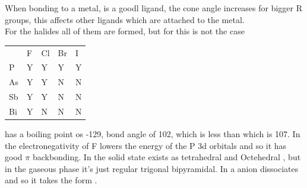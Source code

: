 \documentclass{article}
\begin{document}
    When bonding to a metal,  is a goodl ligand, the cone angle increases for bigger R groups, this affects
    other ligands which are attached to the metal. \\

    For the  halides all of them are formed, but for  this is not the case

    \begin{tabular}{l l l l l}
         & F & Cl & Br & I\\
      P  & Y  & Y & Y & Y \\
      As & Y & Y & N & N\\
      Sb & Y & Y & N & N\\
      Bi & Y & N & N & N
    \end{tabular}

     has a boiling point os -129, bond angle of 102, which is less than  which is 107.
    In  the electronegativity of F lowers the energy of the P 3d orbitals and so it has good $\pi$ backbonding.
    In the solid state  exists as tetrahedral \ce{[PCl4]+} and Octehedral \ce{[PCl6]-}, but in the gaseous phase
    it's just regular trigonal bipyramidal. In  a  anion dissociates and so it takes the form .
\end{document}
